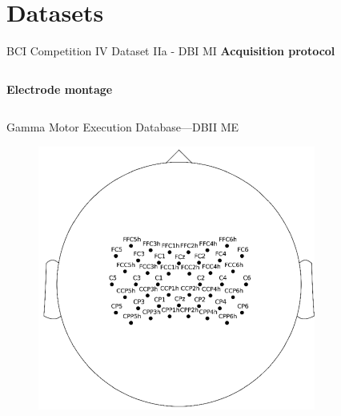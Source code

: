 \documentclass[aspectratio=169]{beamer}
\begin{document}
\section{Datasets}

\begin{frame}{BCI Competition IV Dataset IIa - DBI MI}
    \textbf{Acquisition protocol}
    \begin{figure}[!ht]
        \centering
        \resizebox{0.3\linewidth}{!}{}
    \end{figure}
      \begin{columns}
            \centering

            \centering
            \textbf{Electrode montage}
            \begin{figure}[!ht]
                \centering
            \end{figure}
    \end{columns}
\end{frame}


\begin{frame}{Gamma Motor Execution Database—DBII ME}
    \begin{figure}[h!]
        \centering
            \resizebox{0.9\linewidth}{!}{}
    \end{figure}

    \begin{figure}[h!]
        \centering
        \includegraphics[width=0.3\linewidth]{../Tesis_document/Figures/preliminaries/gammaelectrodes.PNG}
    \end{figure}
\end{frame}
\end{document}
